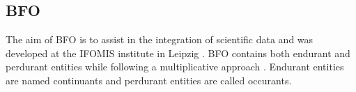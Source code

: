 \documentclass[12pt,a4paper]{article}
\begin{document}
\subsection{BFO}

The aim of BFO is to assist in the integration of scientific data \citep{BFO} and was developed at the IFOMIS institute in Leipzig \citep{Masolo2003}. BFO contains both endurant and perdurant entities while following a multiplicative approach \citep{arp2015building}. Endurant entities are named continuants and perdurant entities are called occurants.



\end{document}
